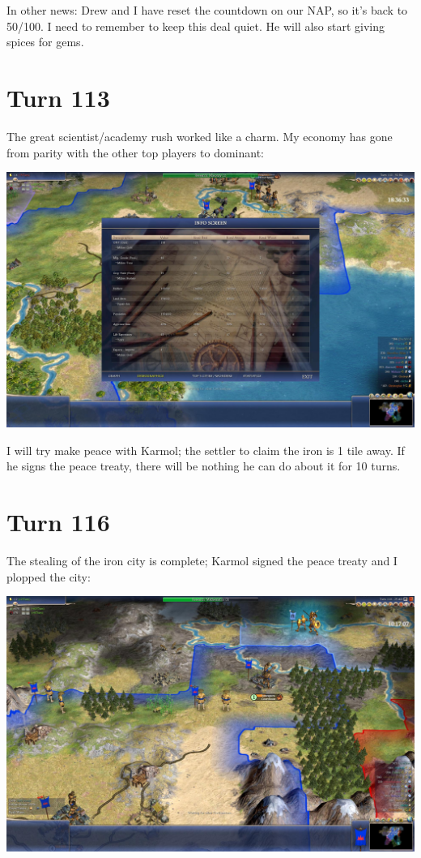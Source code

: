 \documentclass[10pt]{article}
\begin{document}
In other news: Drew and I have reset the countdown on our NAP, so it's
back to 50/100. I need to remember to keep this deal quiet. He will
also start giving spices for gems.

\section*{Turn 113}

The great scientist/academy rush worked like a charm. My economy has
gone from parity with the other top players to dominant:

\includegraphics[width=1.0\textwidth]{turn113}

I will try make peace with Karmol; the settler to claim the iron is 1
tile away. If he signs the peace treaty, there will be nothing he can
do about it for 10 turns.

\section*{Turn 116}

The stealing of the iron city is complete; Karmol signed the peace treaty and I plopped the city:

\includegraphics[width=1.0\textwidth]{turn116}
\end{document}
